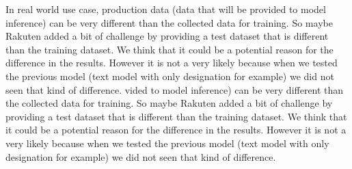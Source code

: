 In real world use case, production data (data that will be provided to model inference) can be very different than the collected data for training. So maybe Rakuten added a bit of challenge by providing a test dataset that is  different than the training dataset. We think that it could be a potential reason for the difference in the results. However it is not a very likely because when we tested the previous model (text model with only designation for example) we did not seen that kind of difference.
vided to model inference) can be very different than the collected data for training. So maybe Rakuten added a bit of challenge by providing a test dataset that is  different than the training dataset. We think that it could be a potential reason for the difference in the results. However it is not a very likely because when we tested the previous model (text model with only designation for example) we did not seen that kind of difference.